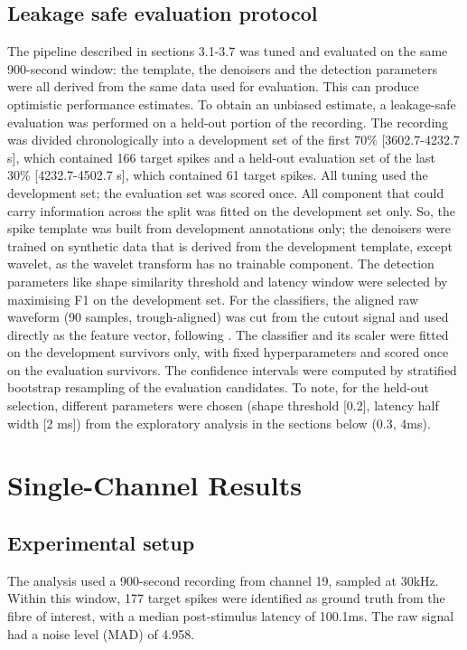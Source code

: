 \documentclass[ %
                    author={Daniel Page},
                supervisor={Dr. Andrew Calway},
                    degree={MSc},
                     title={Some Structural Guidelines for Data Science MSc Theses, Including Those With Long Titles that Run Across Multiple Lines on the Front Page},
                  subtitle={And those including an optional subtitle too, for good measure},
                      type={},
                      year={2021}]{dissertation}
\begin{document}
\section{Leakage safe evaluation protocol}
The pipeline described in sections 3.1-3.7 was tuned and evaluated on the same 900-second window: the template, the denoisers and the detection parameters were all derived from the same data used for evaluation. This can produce optimistic performance estimates. To obtain an unbiased estimate, a leakage-safe evaluation was performed on a held-out portion of the recording.  
The recording was divided chronologically into a development set of the first 70\% [3602.7-4232.7 s], which contained 166 target spikes and a held-out evaluation set of the last 30\% [4232.7-4502.7 s], which contained 61 target spikes. All tuning used the development set; the evaluation set was scored once. 
All component that could carry information across the split was fitted on the development set only. So, the spike template was built from development annotations only; the denoisers were trained on synthetic data that is derived from the development template, except wavelet, as the wavelet transform has no trainable component.  The detection parameters like shape similarity threshold and latency window were selected by maximising F1 on the development set. 
For the classifiers, the aligned raw waveform (90 samples, trough-aligned) was cut from the cutout signal and used directly as the feature vector, following \cite{troglio_hybrid_2026}. The classifier and its scaler were fitted on the development survivors only, with fixed hyperparameters and scored once on the evaluation survivors. The confidence intervals were computed by stratified bootstrap resampling of the evaluation candidates.
To note, for the held-out selection, different parameters were chosen (shape threshold [0.2], latency half width [2 ms]) from the exploratory analysis in the sections below (0.3, 4ms).

\chapter{Single-Channel Results}
\section{Experimental setup}
The analysis used a 900-second recording from channel 19, sampled at 30kHz. Within this window, 177 target spikes were identified as ground truth from the fibre of interest, with a median post-stimulus latency of 100.1ms. The raw signal had a noise level (MAD) of 4.958.
 
\end{document}
